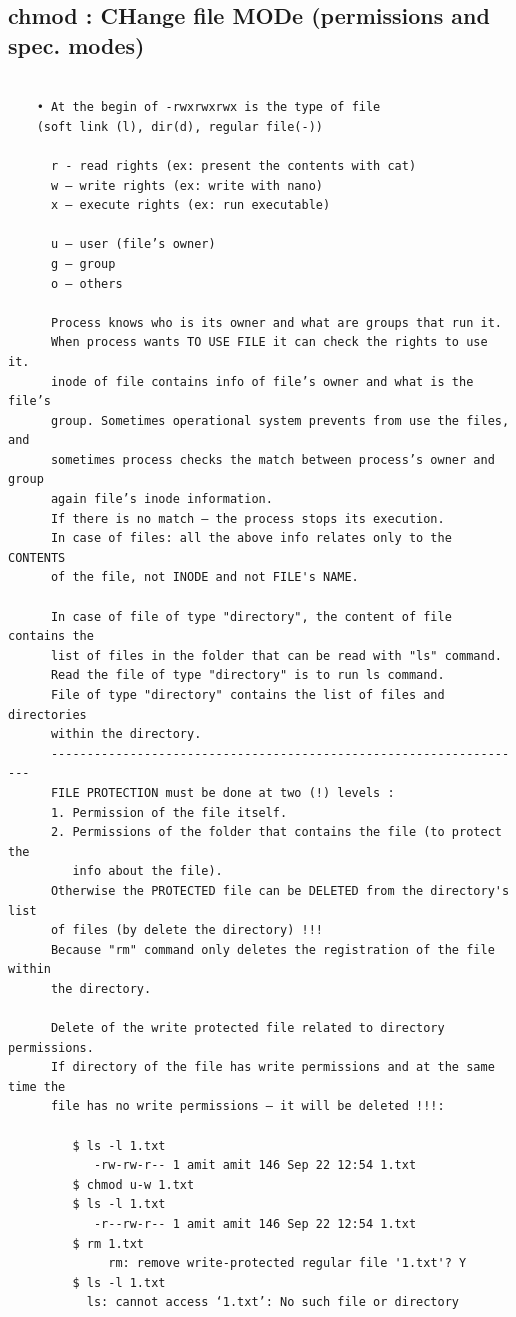 \documentclass[a4paper,12pt]{article}
\begin{document}
\subsection{chmod  : CHange file MODe (permissions and spec. modes)}
\begin{verbatim}

    • At the begin of -rwxrwxrwx is the type of file 
    (soft link (l), dir(d), regular file(-)) 

      r - read rights (ex: present the contents with cat)
      w – write rights (ex: write with nano)
      x – execute rights (ex: run executable)

      u – user (file’s owner)
      g – group
      o – others

      Process knows who is its owner and what are groups that run it.
      When process wants TO USE FILE it can check the rights to use it. 
      inode of file contains info of file’s owner and what is the file’s
      group. Sometimes operational system prevents from use the files, and
      sometimes process checks the match between process’s owner and group 
      again file’s inode information. 
      If there is no match – the process stops its execution. 
      In case of files: all the above info relates only to the CONTENTS 
      of the file, not INODE and not FILE's NAME. 
      
      In case of file of type "directory", the content of file contains the  
      list of files in the folder that can be read with "ls" command.
      Read the file of type "directory" is to run ls command. 
      File of type "directory" contains the list of files and directories  
      within the directory.
	  -------------------------------------------------------------------	
	  FILE PROTECTION must be done at two (!) levels : 
	  1. Permission of the file itself.
	  2. Permissions of the folder that contains the file (to protect the 
	     info about the file).
	  Otherwise the PROTECTED file can be DELETED from the directory's list 
	  of files (by delete the directory) !!!
	  Because "rm" command only deletes the registration of the file within 
	  the directory. 
	  
	  Delete of the write protected file related to directory permissions. 
	  If directory of the file has write permissions and at the same time the 
	  file has no write permissions – it will be deleted !!!:    
﻿
         $ ls -l 1.txt
	        -rw-rw-r-- 1 amit amit 146 Sep 22 12:54 1.txt
         $ chmod u-w 1.txt
         $ ls -l 1.txt
	        -r--rw-r-- 1 amit amit 146 Sep 22 12:54 1.txt
﻿         $ rm 1.txt
	          rm: remove write-protected regular file '1.txt'? Y
﻿         $ ls -l 1.txt
	       ls: cannot access ‘1.txt’: No such file or directory


\end{verbatim}
\end{document}
